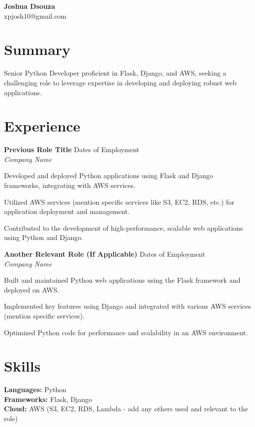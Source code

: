 \documentclass[10pt,a4paper]{article}
\newcommand{\resumeItem}[1]{\item[\textbf{$\cdot$}] #1}
\begin{document}
\begin{center}
    {\Large \textbf{Joshua Dsouza}} \\
    xpjosh10@gmail.com
\end{center}

\vspace{0.2in}

\section*{Summary}
Senior Python Developer proficient in Flask, Django, and AWS, seeking a challenging role to leverage expertise in developing and deploying robust web applications.

\vspace{0.2in}

\section*{Experience}

\textbf{Previous Role Title} \hfill Dates of Employment \\
\textit{Company Name} \\
\resumeItem{Developed and deployed Python applications using Flask and Django frameworks, integrating with AWS services.}
\resumeItem{Utilized AWS services (mention specific services like S3, EC2, RDS, etc.) for application deployment and management.}
\resumeItem{Contributed to the development of high-performance, scalable web applications using Python and Django.}


\textbf{Another Relevant Role (If Applicable)} \hfill Dates of Employment \\
\textit{Company Name} \\
\resumeItem{Built and maintained Python web applications using the Flask framework and deployed on AWS.}
\resumeItem{Implemented key features using Django and integrated with various AWS services (mention specific services).}
\resumeItem{Optimized Python code for performance and scalability in an AWS environment.}


\vspace{0.2in}

\section*{Skills}
\textbf{Languages:} Python \\
\textbf{Frameworks:} Flask, Django \\
\textbf{Cloud:} AWS (S3, EC2, RDS, Lambda -  add any others used and relevant to the role)
\end{document}
